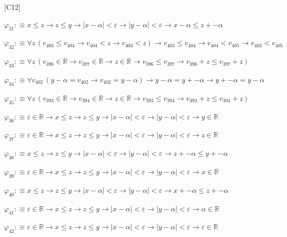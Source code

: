 \begin{fullproof}{[C12]}
\begin{abbrevlist}
\item $\varphi_{31} :\equiv x \leq z \to z \leq y \to \lvert x - \alpha \rvert < \varepsilon \to \lvert y - \alpha \rvert < \varepsilon \to x - \alpha \leq z + -\alpha$
\item $\varphi_{32} :\equiv \forall z\,(v_{403} \leq v_{404} \to v_{404} < z \to v_{403} < z) \to v_{403} \leq v_{404} \to v_{404} < v_{405} \to v_{403} < v_{405}$
\item $\varphi_{33} :\equiv \forall z\,(v_{396} \in \mathbb{R} \to v_{397} \in \mathbb{R} \to z \in \mathbb{R} \to v_{396} \leq v_{397} \to v_{396} + z \leq v_{397} + z)$
\item $\varphi_{34} :\equiv \forall v_{402}\,(y - \alpha = v_{402} \to v_{402} = y - \alpha) \to y - \alpha = y + -\alpha \to y + -\alpha = y - \alpha$
\item $\varphi_{35} :\equiv \forall z\,(v_{393} \in \mathbb{R} \to v_{394} \in \mathbb{R} \to z \in \mathbb{R} \to v_{393} \leq v_{394} \to v_{393} + z \leq v_{394} + z)$
\item $\varphi_{36} :\equiv \varepsilon \in \mathbb{R} \to x \leq z \to z \leq y \to \lvert x - \alpha \rvert < \varepsilon \to \lvert y - \alpha \rvert < \varepsilon \to y \in \mathbb{R}$
\item $\varphi_{37} :\equiv \varepsilon \in \mathbb{R} \to x \leq z \to z \leq y \to \lvert x - \alpha \rvert < \varepsilon \to \lvert y - \alpha \rvert < \varepsilon \to z \in \mathbb{R}$
\item $\varphi_{38} :\equiv x \leq z \to z \leq y \to \lvert x - \alpha \rvert < \varepsilon \to \lvert y - \alpha \rvert < \varepsilon \to z + -\alpha \leq y + -\alpha$
\item $\varphi_{39} :\equiv \varepsilon \in \mathbb{R} \to x \leq z \to z \leq y \to \lvert x - \alpha \rvert < \varepsilon \to \lvert y - \alpha \rvert < \varepsilon \to x \in \mathbb{R}$
\item $\varphi_{40} :\equiv x \leq z \to z \leq y \to \lvert x - \alpha \rvert < \varepsilon \to \lvert y - \alpha \rvert < \varepsilon \to x + -\alpha \leq z + -\alpha$
\item $\varphi_{41} :\equiv \varepsilon \in \mathbb{R} \to x \leq z \to z \leq y \to \lvert x - \alpha \rvert < \varepsilon \to \lvert y - \alpha \rvert < \varepsilon \to \alpha \in \mathbb{R}$
\item $\varphi_{42} :\equiv \varepsilon \in \mathbb{R} \to x \leq z \to z \leq y \to \lvert x - \alpha \rvert < \varepsilon \to \lvert y - \alpha \rvert < \varepsilon \to \varepsilon \in \mathbb{R}$

\end{abbrevlist}
\end{fullproof}
